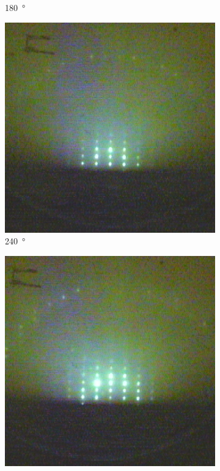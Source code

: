 \begin{figure}
\begin{subfigure}{0.2\linewidth}
        \caption{\qty{180}{\degree}}
    \end{subfigure}
    \begin{subfigure}{0.2\linewidth}
        \includegraphics[width=\textwidth]{../data/edited/2_1_263deg.pdf}
        \caption{\qty{240}{\degree}}
    \end{subfigure}
    \begin{subfigure}{0.2\linewidth}
        \includegraphics[width=\textwidth]{../data/edited/2_1_323deg.pdf}

\end{subfigure}
\end{figure}
